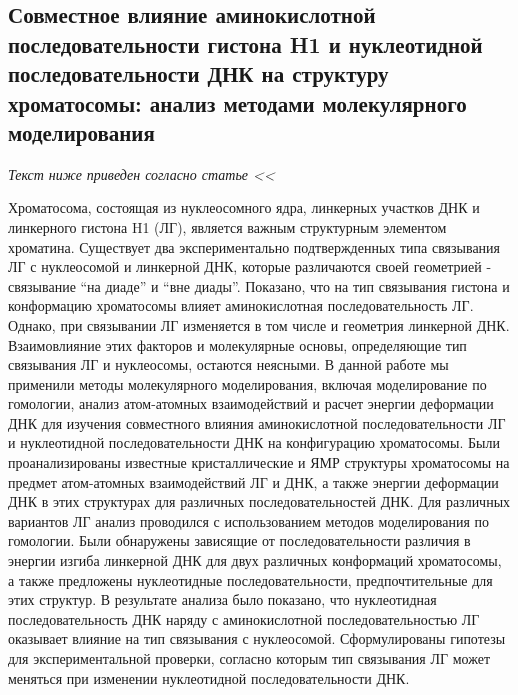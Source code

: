 \subsection{Совместное влияние аминокислотной последовательности гистона H1 и нуклеотидной последовательности ДНК на структуру хроматосомы: анализ методами молекулярного моделирования}

\textit{Текст ниже приведен согласно статье \cite{gorkovets_joint_2018} <<}

Хроматосома, состоящая из нуклеосомного ядра, линкерных участков ДНК и линкерного гистона H1 (ЛГ), является важным структурным элементом хроматина. Существует два экспериментально подтвержденных типа связывания ЛГ с нуклеосомой и линкерной ДНК, которые различаются своей геометрией - связывание ``на диаде'' и ``вне диады''. Показано, что на тип связывания гистона и конформацию хроматосомы влияет аминокислотная последовательность ЛГ.  Однако, при связывании ЛГ изменяется в том числе и геометрия линкерной ДНК. Взаимовлияние этих факторов и молекулярные основы, определяющие тип связывания ЛГ и нуклеосомы, остаются неясными. В данной работе мы применили методы молекулярного моделирования, включая моделирование по гомологии, анализ атом-атомных взаимодействий и расчет энергии деформации ДНК для изучения совместного влияния аминокислотной последовательности ЛГ и нуклеотидной последовательности ДНК на конфигурацию хроматосомы. Были проанализированы известные кристаллические и ЯМР структуры хроматосомы на предмет атом-атомных взаимодействий ЛГ и ДНК, а также энергии деформации ДНК в этих структурах для различных последовательностей ДНК. Для различных вариантов ЛГ анализ проводился с использованием методов моделирования по гомологии. Были обнаружены зависящие от последовательности различия в энергии изгиба линкерной ДНК для двух различных конформаций хроматосомы, а также предложены нуклеотидные последовательности, предпочтительные для этих структур. В результате анализа было показано, что нуклеотидная  последовательность ДНК наряду с аминокислотной последовательностью ЛГ оказывает влияние на тип связывания с нуклеосомой. Сформулированы гипотезы для экспериментальной проверки, согласно которым тип связывания ЛГ может меняться при изменении нуклеотидной последовательности ДНК. 

